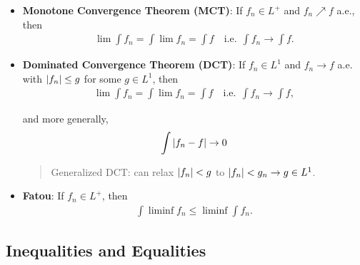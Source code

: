 \begin{itemize}
\item
  \textbf{Monotone Convergence Theorem (MCT)}: If \(f_n \in L^+\) and
  \(f_n \nearrow f\) a.e., then
  \begin{align*}
  \lim \int f_n 
  = \int \lim f_n = \int f
  \quad \text{i.e.}~~ \int f_n \to \int f
  .\end{align*}
\item
  \textbf{Dominated Convergence Theorem (DCT)}: If \(f_n \in L^1\) and
  \(f_n \to f\) a.e. with \({\left\lvert {f_n} \right\rvert} \leq g\) for some \(g\in L^1\),
  then
  \begin{align*}
  \lim \int f_n = \int \lim f_n = \int f \quad \text{i.e.}~~ \int f_n \to \int f
  ,\end{align*}

  and more generally,
  \begin{align*}
  \int {\left\lvert {f_n - f} \right\rvert} \to 0
  \end{align*}

  \begin{quote}
  Generalized DCT: can relax \({\left\lvert {f_n} \right\rvert} < g\) to
  \({\left\lvert {f_n} \right\rvert} < g_n \to g\in L^1\).
  \end{quote}
\item
  \textbf{Fatou}: If \(f_n \in L^+\), then
  \begin{align*}
  \int \liminf f_n \leq \liminf \int f_n
  .\end{align*}
\end{itemize}

\hypertarget{inequalities-and-equalities}{%
\subsection{Inequalities and
Equalities}\label{inequalities-and-equalities}}

